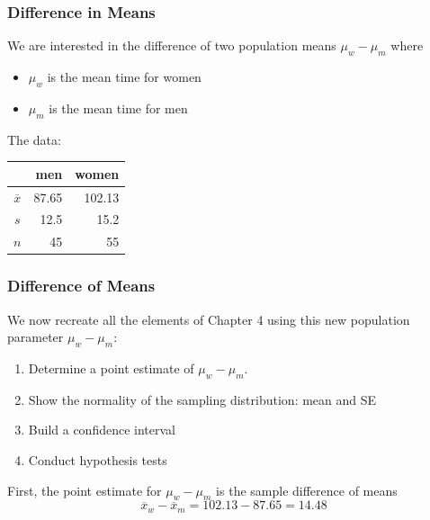 \documentclass[slides]{beamer}
\newcommand{\blue}[1]{\textcolor{blue2}{#1}}
\newcommand{\xbar}{\overline{x}}
\begin{document}
\begin{frame}[fragile]
\frametitle{Difference in Means}
We are interested in the difference of two population means $\mu_w - \mu_m$ where
\pause\begin{itemize}
\item $\mu_w$ is the mean time for women
\item $\mu_m$ is the mean time for men
\end{itemize}

\pause\vspace{0.5cm}
The data:
\begin{center}
  \begin{tabular}{c|rr}
     & men & women \\ 
\hline
    $\overline{x}$ & 87.65 & 102.13 \\ 
    $s$ & 12.5 & 15.2 \\ 
    $n$ & 45 & 55 \\ 
\end{tabular}
\end{center}

\end{frame}


\begin{frame}[fragile]
\frametitle{Difference of Means}
We now recreate all the elements of Chapter 4 using this new \blue{population parameter}  $\mu_w - \mu_m$:

\vspace{0.25cm}

\begin{enumerate}
\pause\item Determine a point estimate of $\mu_w - \mu_m$.
\pause\item Show the normality of the sampling distribution:  mean and SE
\pause\item Build a confidence interval
\pause\item Conduct hypothesis tests
\end{enumerate}

\vspace{0.25cm}

\pause First, the \blue{point estimate} for $\mu_w - \mu_m$ is the \blue{sample difference of means}
\[\xbar_w - \xbar_m = 102.13-87.65=14.48\]



\end{frame}
\end{document}
